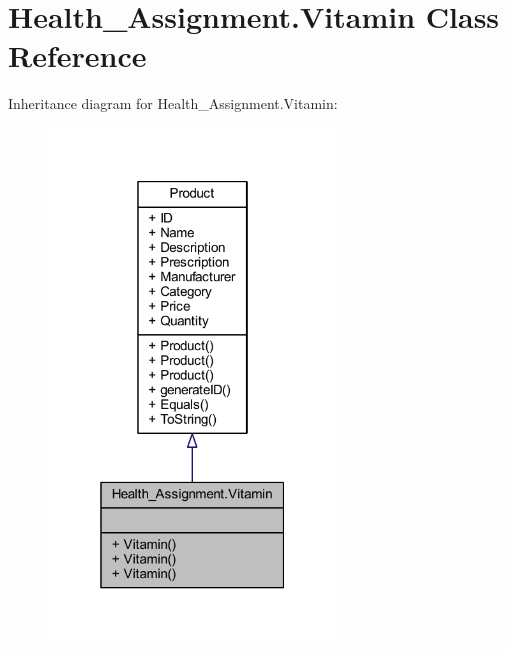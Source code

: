 \hypertarget{class_health___assignment_1_1_vitamin}{}\section{Health\+\_\+\+Assignment.\+Vitamin Class Reference}
\label{class_health___assignment_1_1_vitamin}


Inheritance diagram for Health\+\_\+\+Assignment.\+Vitamin\+:\nopagebreak
\begin{figure}[H]
\begin{center}
\leavevmode
\includegraphics[width=217pt]{class_health___assignment_1_1_vitamin__inherit__graph}
\end{center}
\end{figure}


